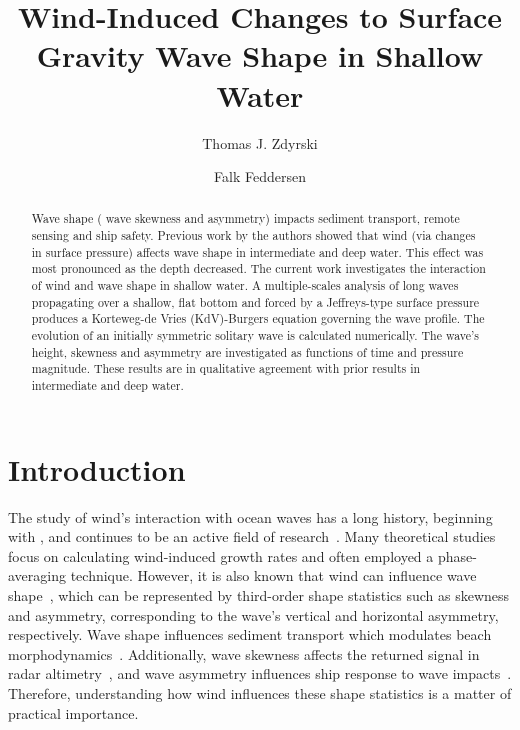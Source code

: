\documentclass{jfm}
\title{Wind-Induced Changes to Surface Gravity Wave Shape in Shallow Water}
\author{Thomas J. Zdyrski \and Falk Feddersen}
\begin{document}
\maketitle

\begin{abstract}
Wave shape (\eg{} wave skewness and asymmetry) impacts sediment
transport, remote sensing and ship safety.
Previous work by the authors showed that wind (via changes in surface
pressure) affects wave shape in intermediate and deep water.
This effect was most pronounced as the depth decreased.
The current work investigates the interaction of wind and wave shape in
shallow water.
A multiple-scales analysis of long waves propagating over a shallow,
flat bottom and forced by a Jeffreys-type surface pressure produces a
Korteweg-de Vries (KdV)-Burgers equation governing the wave profile.
The evolution of an initially symmetric solitary wave is calculated
numerically.
The wave's height, skewness and asymmetry are investigated as functions
of time and pressure magnitude.
These results are in qualitative agreement with prior results in
intermediate and deep water.
\end{abstract}

\section{Introduction}

The study of wind's interaction with ocean waves has a long history, beginning
with \citet{jeffreys1925formation}, and continues to be an active field
of
research~\citep[\eg][]{janssen1991quasi,donelan2004limiting,sulivan2010dynamics}.
Many theoretical
studies~\citep[\eg][]{jeffreys1925formation,miles1957generation,phillips1957generation}
focus on calculating wind-induced growth rates and often employed a
phase-averaging technique.
However, it is also known that wind can influence wave
shape~\citep[\eg][]{leykin1995asymmetry,feddersen2005wind,zdyrski2020wind},
which can be represented by third-order shape statistics such as
skewness and asymmetry, corresponding to the wave's vertical and
horizontal asymmetry, respectively.
Wave shape influences sediment transport
\citep[\eg][]{drake2001discrete, gonzalez2007seabed} which modulates
beach morphodynamics~\citep[\eg][]{hoefel2003wave}.
Additionally, wave skewness affects the returned signal in radar
altimetry~\citep[\eg][]{hayne1980radar,huang1983non},
and wave asymmetry influences ship response to wave
impacts~\citep[\eg][]{soares2008abnormal,oberhagemann2013prediction}.
Therefore, understanding how wind influences these shape statistics is a
matter of practical importance.
\end{document}
